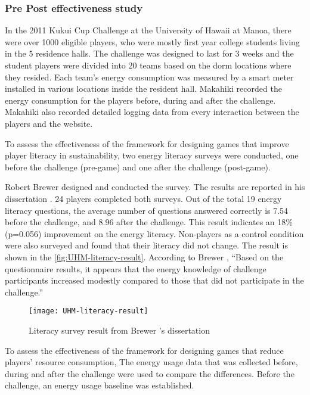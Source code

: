 \subsubsection{Pre Post effectiveness study}
\label{sec:player-pre-post-effectiveness-result}

In the 2011 Kukui Cup Challenge at the University of Hawaii at Manoa, there were over 1000 eligible players, who were mostly first
year college students living in the 5 residence halls. The challenge was designed to last for 3 weeks and the student players were divided into 20 teams based on the dorm locations where they resided. Each team's energy consumption was measured by a smart meter installed in various locations inside the resident hall. Makahiki recorded the energy consumption for the players before, during and after the challenge. Makahiki also recorded detailed logging data from every interaction between the players and the website. 

To assess the effectiveness of the framework for designing games that improve player literacy in sustainability, 
 two energy literacy surveys were conducted, one before the challenge (pre-game) and one after
the challenge (post-game). 

Robert Brewer designed and conducted the survey. The results are reported in his dissertation \cite{csdl2-10-08}. 24 players completed both surveys. Out of the total 19 energy literacy questions, the average number of questions answered correctly is 7.54 before the
challenge, and 8.96 after the challenge. This result indicates an 18\% (p=0.056) improvement on the
energy literacy.  Non-players as a control condition were also surveyed and found that their literacy did not change. The result is shown in the \autoref{fig:UHM-literacy-result}. According to Brewer \cite{csdl2-10-08}, ``Based on the questionnaire results, it appears that the energy knowledge of challenge participants increased modestly compared to those that did not participate in the challenge.''
\begin{figure}[ht!]
  \center
  \texttt{[image: UHM-literacy-result]}
  \caption{Literacy survey result from Brewer 's dissertation \cite{csdl2-10-08}}
  \label{fig:UHM-literacy-result}
\end{figure}

To assess the effectiveness of the framework for designing games that reduce players' resource consumption, The energy usage data that was collected before, during and after the
challenge were used to compare the differences.  Before the challenge, an energy usage baseline was established. 

